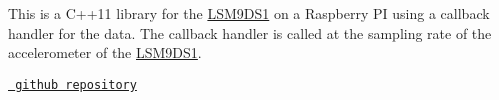 This is a C++11 library for the \mbox{\hyperlink{classLSM9DS1}{L\+S\+M9\+D\+S1}} on a Raspberry PI using a callback handler for the data. The callback handler is called at the sampling rate of the accelerometer of the \mbox{\hyperlink{classLSM9DS1}{L\+S\+M9\+D\+S1}}.

\href{https://github.com/berndporr/LSM9DS1_RaspberryPi_CPP_Library}{\texttt{ github repository}} 